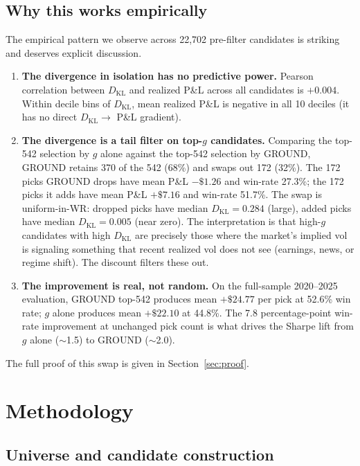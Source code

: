 \documentclass[11pt]{article}
\newcommand{\KL}{D_{\mathrm{KL}}}
\theoremstyle{definition}
\theoremstyle{remark}
\begin{document}
\subsection{Why this works empirically}
\label{sec:rvvsiv-works}

The empirical pattern we observe across 22{,}702 pre-filter
candidates is striking and deserves explicit discussion.

\begin{enumerate}
\item \textbf{The divergence in isolation has no predictive power.}
Pearson correlation between $\KL$ and realized P\&L across all
candidates is $+0.004$. Within decile bins of $\KL$, mean realized
P\&L is negative in all 10 deciles (it has no direct $\KL \to $ P\&L
gradient).
\item \textbf{The divergence is a tail filter on top-$g$ candidates.}
Comparing the top-542 selection by $g$ alone against the top-542
selection by GROUND, GROUND retains 370 of the 542 (68\%) and swaps
out 172 (32\%). The 172 picks GROUND drops have mean P\&L $-\$1.26$
and win-rate 27.3\%; the 172 picks it adds have mean P\&L $+\$7.16$
and win-rate 51.7\%. The swap is uniform-in-WR: dropped picks have
median $\KL = 0.284$ (large), added picks have median $\KL = 0.005$
(near zero). The interpretation is that high-$g$ candidates with high
$\KL$ are precisely those where the market's implied vol is signaling
something that recent realized vol does not see (earnings, news, or
regime shift). The discount filters these out.
\item \textbf{The improvement is real, not random.} On the
full-sample 2020--2025 evaluation, GROUND top-542 produces mean
$+\$24.77$ per pick at 52.6\% win rate; $g$ alone produces mean
$+\$22.10$ at 44.8\%. The 7.8 percentage-point win-rate improvement
at unchanged pick count is what drives the Sharpe lift from $g$ alone
($\sim$1.5) to GROUND ($\sim$2.0).
\end{enumerate}

The full proof of this swap is given in Section~\ref{sec:proof}.


\section{Methodology}
\label{sec:methodology}

\subsection{Universe and candidate construction}
\end{document}
